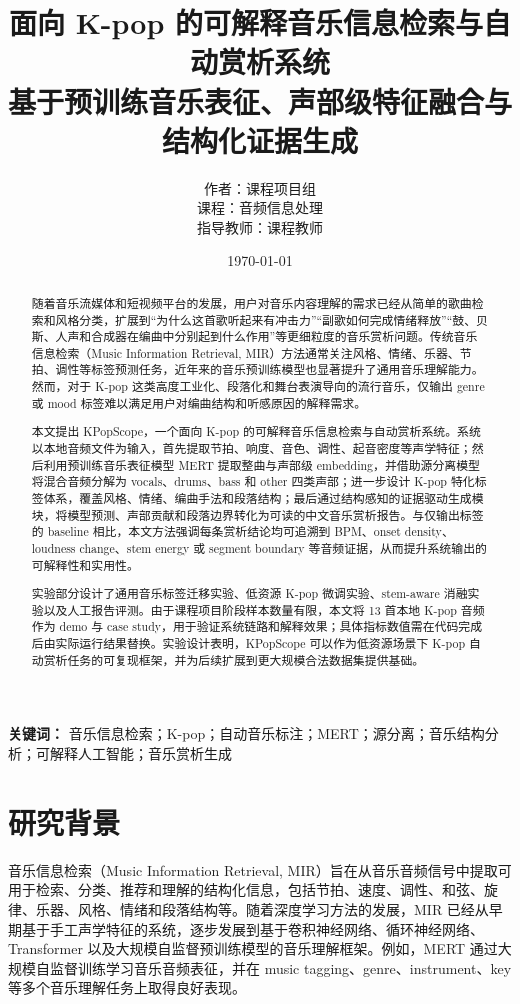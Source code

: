 \documentclass[UTF8,zihao=-4]{ctexart}
\title{\textbf{面向 K-pop 的可解释音乐信息检索与自动赏析系统}\\
\large 基于预训练音乐表征、声部级特征融合与结构化证据生成}
\author{作者：课程项目组 \\
课程：音频信息处理 \\
指导教师：课程教师}
\date{\today}
\newcommand{\method}{KPopScope}
\begin{document}
\maketitle

\begin{abstract}
随着音乐流媒体和短视频平台的发展，用户对音乐内容理解的需求已经从简单的歌曲检索和风格分类，扩展到“为什么这首歌听起来有冲击力”“副歌如何完成情绪释放”“鼓、贝斯、人声和合成器在编曲中分别起到什么作用”等更细粒度的音乐赏析问题。传统音乐信息检索（Music Information Retrieval, MIR）方法通常关注风格、情绪、乐器、节拍、调性等标签预测任务，近年来的音乐预训练模型也显著提升了通用音乐理解能力。然而，对于 K-pop 这类高度工业化、段落化和舞台表演导向的流行音乐，仅输出 genre 或 mood 标签难以满足用户对编曲结构和听感原因的解释需求。

本文提出 \method{}，一个面向 K-pop 的可解释音乐信息检索与自动赏析系统。系统以本地音频文件为输入，首先提取节拍、响度、音色、调性、起音密度等声学特征；然后利用预训练音乐表征模型 MERT 提取整曲与声部级 embedding，并借助源分离模型将混合音频分解为 vocals、drums、bass 和 other 四类声部；进一步设计 K-pop 特化标签体系，覆盖风格、情绪、编曲手法和段落结构；最后通过结构感知的证据驱动生成模块，将模型预测、声部贡献和段落边界转化为可读的中文音乐赏析报告。与仅输出标签的 baseline 相比，本文方法强调每条赏析结论均可追溯到 BPM、onset density、loudness change、stem energy 或 segment boundary 等音频证据，从而提升系统输出的可解释性和实用性。

实验部分设计了通用音乐标签迁移实验、低资源 K-pop 微调实验、stem-aware 消融实验以及人工报告评测。由于课程项目阶段样本数量有限，本文将 13 首本地 K-pop 音频作为 demo 与 case study，用于验证系统链路和解释效果；具体指标数值需在代码完成后由实际运行结果替换。实验设计表明，\method{} 可以作为低资源场景下 K-pop 自动赏析任务的可复现框架，并为后续扩展到更大规模合法数据集提供基础。
\end{abstract}

\noindent\textbf{关键词：} 音乐信息检索；K-pop；自动音乐标注；MERT；源分离；音乐结构分析；可解释人工智能；音乐赏析生成

\tableofcontents
\newpage

\section{研究背景}

音乐信息检索（Music Information Retrieval, MIR）旨在从音乐音频信号中提取可用于检索、分类、推荐和理解的结构化信息，包括节拍、速度、调性、和弦、旋律、乐器、风格、情绪和段落结构等。随着深度学习方法的发展，MIR 已经从早期基于手工声学特征的系统，逐步发展到基于卷积神经网络、循环神经网络、Transformer 以及大规模自监督预训练模型的音乐理解框架。例如，MERT 通过大规模自监督训练学习音乐音频表征，并在 music tagging、genre、instrument、key 等多个音乐理解任务上取得良好表现\cite{mert2023}。
\end{document}
